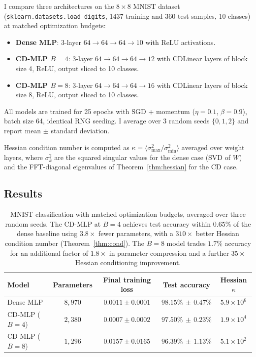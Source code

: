 \documentclass[aps,prx,onecolumn,11pt,nofootinbib,longbibliography]{revtex4-2}
\begin{document}
I compare three architectures on the $8\times 8$ MNIST dataset
(\texttt{sklearn.datasets.load\_digits}, 1437 training and 360 test samples,
10 classes) at matched optimization budgets:
\begin{itemize}
\item \textbf{Dense MLP}: 3-layer $64\to 64\to 64\to 10$ with ReLU activations.
\item \textbf{CD-MLP $B=4$}: 3-layer $64\to 64\to 64\to 12$ with CDLinear
layers of block size 4, ReLU, output sliced to 10 classes.
\item \textbf{CD-MLP $B=8$}: 3-layer $64\to 64\to 64\to 16$ with CDLinear
layers of block size 8, ReLU, output sliced to 10 classes.
\end{itemize}
All models are trained for 25 epochs with SGD + momentum
($\eta = 0.1$, $\beta = 0.9$), batch size 64, identical RNG seeding.  I
average over 3 random seeds $\{0, 1, 2\}$ and report mean $\pm$ standard
deviation.

Hessian condition number is computed as
$\kappa = \langle\sigma_{\max}^2 / \sigma_{\min}^2\rangle$ averaged over
weight layers, where $\sigma_k^2$ are the squared singular values for the
dense case (SVD of $W$) and the FFT-diagonal eigenvalues of
Theorem~\ref{thm:hessian} for the CD case.

\subsection{Results}

\begin{table}[t]
\centering
\caption{MNIST classification with matched optimization budgets, averaged
over three random seeds.  The CD-MLP at $B=4$ achieves test accuracy within
$0.65\%$ of the dense baseline using $3.8\times$ fewer parameters, with a
$310\times$ better Hessian condition number (Theorem~\ref{thm:cond}).
The $B=8$ model trades $1.7\%$ accuracy for an additional factor of
$1.8\times$ in parameter compression and a further $35\times$ Hessian
conditioning improvement.}
\label{tab:mnist}
\renewcommand{\arraystretch}{1.2}
\begin{tabular}{@{}lcccc@{}}
\toprule
Model
  & Parameters
  & Final training loss
  & Test accuracy
  & Hessian $\kappa$ \\
\midrule
Dense MLP            & $8{,}970$ & $0.0011 \pm 0.0001$ & $98.15\%\,\pm\,0.47\%$  & $5.9\times 10^{6}$ \\
CD-MLP ($B=4$)       & $2{,}380$ & $0.0007 \pm 0.0002$ & $97.50\%\,\pm\,0.23\%$  & $1.9\times 10^{4}$ \\
CD-MLP ($B=8$)       & $1{,}296$ & $0.0157 \pm 0.0165$ & $96.39\%\,\pm\,1.13\%$  & $5.1\times 10^{2}$ \\
\bottomrule
\end{tabular}
\end{table}
\end{document}
